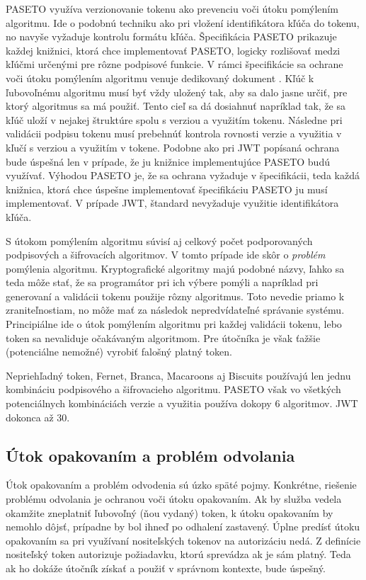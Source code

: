 PASETO využíva verzionovanie tokenu ako prevenciu voči útoku pomýlením algoritmu. Ide o podobnú techniku ako pri vložení identifikátora kľúča do tokenu, no navyše vyžaduje kontrolu formátu kľúča. Špecifikácia PASETO \cite{paseto_git} prikazuje každej knižnici, ktorá chce implementovať PASETO, logicky rozlišovať medzi kľúčmi určenými pre rôzne podpisové funkcie. V rámci špecifikácie sa ochrane voči útoku pomýlením algoritmu venuje dedikovaný dokument \cite{alg_lucidity}. Kľúč k ľubovoľnému algoritmu musí byť vždy uložený tak, aby sa dalo jasne určiť, pre ktorý algoritmus sa má použiť. Tento cieľ sa dá dosiahnuť napríklad tak, že sa kľúč uloží v nejakej štruktúre spolu s verziou a využitím tokenu. Následne pri validácii podpisu tokenu musí prebehnúť kontrola rovnosti verzie a využitia v kľučí s verziou a využitím v tokene. Podobne ako pri JWT popísaná ochrana bude úspešná len v prípade, že ju knižnice implementujúce PASETO budú využívať. Výhodou PASETO je, že sa ochrana vyžaduje v špecifikácii, teda každá knižnica, ktorá chce úspešne implementovať špecifikáciu PASETO ju musí implementovať. V prípade JWT, štandard \cite{jwt_rfc} nevyžaduje využitie identifikátora kľúča.

S útokom pomýlením algoritmu súvisí aj celkový počet podporovaných podpisových a šifrovacích algoritmov. V tomto prípade ide skôr o \textit{problém} pomýlenia algoritmu. Kryptografické algoritmy majú podobné názvy, ľahko sa teda môže stať, že sa programátor pri ich výbere pomýli a napríklad pri generovaní a validácii tokenu použije rôzny algoritmus. Toto nevedie priamo k zraniteľnostiam, no môže mať za následok nepredvídateľné správanie systému. Principiálne ide o útok pomýlením algoritmu pri každej validácii tokenu, lebo token sa nevaliduje očakávaným algoritmom. Pre útočníka je však ťažšie (potenciálne nemožné) vyrobiť falošný platný token.

Nepriehľadný token, Fernet, Branca, Macaroons aj Biscuits používajú len jednu kombináciu podpisového a šifrovacieho algoritmu. PASETO však vo všetkých potenciálnych kombináciách verzie a využitia používa dokopy 6 algoritmov. JWT dokonca až 30.

\subsection{Útok opakovaním a problém odvolania}

\label{sec:replay} %

Útok opakovaním a problém odvodenia sú úzko späté pojmy. Konkrétne, riešenie problému odvolania je ochranou voči útoku opakovaním. Ak by služba vedela okamžite zneplatniť ľubovoľný (ňou vydaný) token, k útoku opakovaním by nemohlo dôjsť, prípadne by bol ihneď po odhalení zastavený. Úplne predísť útoku opakovaním sa pri využívaní nositeľských tokenov na autorizáciu nedá. Z definície nositeľský token autorizuje požiadavku, ktorú sprevádza ak je sám platný. Teda ak ho dokáže útočník získať a použiť v správnom kontexte, bude úspešný.

